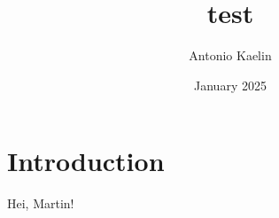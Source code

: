 \documentclass{article}
\title{test}
\author{Antonio Kaelin}
\date{January 2025}
\begin{document}
\maketitle

\section{Introduction}
Hei, Martin!
\end{document}
